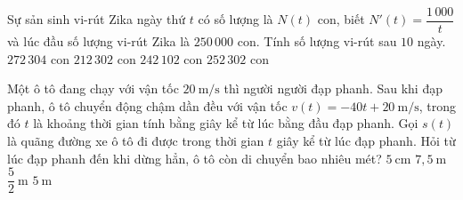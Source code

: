 

\begin{ex}%
	Sự sản sinh vi-rút Zika ngày thứ $t$ có số lượng là  $N(t)$ con, biết $N'(t)=\dfrac{1\,000}{t}$ và lúc đầu số lượng vi-rút Zika là $250\,000$ con. Tính số lượng vi-rút sau $10$ ngày.
	 \choice
		 {$272\,304$ con}
		{$212\,302$ con} 
		 {$242\,102$ con}
		{\True  $252\,302$ con}
\end{ex}

\begin{ex}%
	Một ô tô đang chạy với vận tốc $20~\mathrm{m/s} $ thì người người đạp phanh. Sau khi đạp phanh, ô tô chuyển động chậm dần đều với vận tốc $v(t)=-40t+20~\mathrm{m/s}$, trong đó $t$ là khoảng thời gian tính bằng giây kể từ lúc bằng đầu đạp phanh. Gọi $s(t)$ là quãng đường xe ô tô đi được trong  thời gian $t$ giây kể từ lúc đạp phanh. Hỏi từ lúc đạp phanh đến khi dừng hẳn, ô tô còn di chuyển bao nhiêu mét?
	\choice 
		{$5~\mathrm{cm}$} 
		{$7{,}5~\mathrm{m}$} 
		 {$\dfrac{5}{2}~\mathrm{m}$}
		 {\True $5~\mathrm{m}$}
\end{ex}

